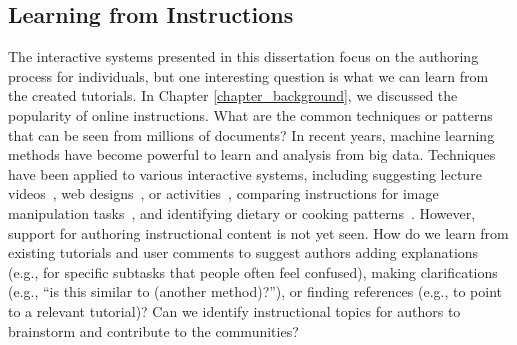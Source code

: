 \subsection{Learning from Instructions}
The interactive systems presented in this dissertation focus on the authoring process for individuals, but one interesting question is what we can learn from the created tutorials. In Chapter \ref{chapter_background}, we discussed the popularity of online instructions. What are the common techniques or patterns that can be seen from millions of documents? In recent years, machine learning methods have become powerful to learn and analysis from big data. Techniques have been applied to various interactive systems, including suggesting lecture videos~\cite{Kim:2014:DIT:2642918.2647389}, web designs~\cite{Kumar:2013:WDM:2470654.2466420}, or activities~\cite{Fast:2016:AMH:2858036.2858528}, comparing instructions for image manipulation tasks~\cite{Pavel:EECS-2013-167}, and identifying dietary or cooking patterns~\cite{IBMChefWatson,West:2013:CCI:2488388.2488510}. However, support for authoring instructional content is not yet seen. How do we learn from existing tutorials and user comments to suggest authors adding explanations (e.g., for specific subtasks that people often feel confused), making clarifications (e.g., ``is this similar to (another method)?''), or finding references (e.g., to point to a relevant tutorial)? Can we identify instructional topics for authors to brainstorm and contribute to the communities?

